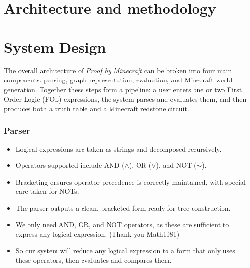 \documentclass[11pt]{diazessay} %
\begin{document}

\section*{Architecture and methodology}

\section{System Design}

The overall architecture of \textit{Proof by Minecraft} can be broken into four
main components: parsing, graph representation, evaluation, and Minecraft
world generation. Together these steps form a pipeline: a user enters one
or two First Order Logic (FOL) expressions, the system parses and evaluates
them, and then produces both a truth table and a Minecraft redstone circuit.

\subsubsection*{Parser}
\begin{itemize}
    \item Logical expressions are taken as strings and decomposed recursively.
    \item Operators supported include AND ($\wedge$), OR ($\vee$), and NOT ($\sim$).
    \item Bracketing ensures operator precedence is correctly maintained, with 
    special care taken for NOTs.
    \item The parser outputs a clean, bracketed form ready for tree construction.
    \item We only need AND, OR, and NOT operators, as these are sufficient to express any logical expression. (Thank you Math1081)
    \item So our system will reduce any logical expression to a form that only uses these operators, then evaluates and compares them.
\end{itemize}
\end{document}
